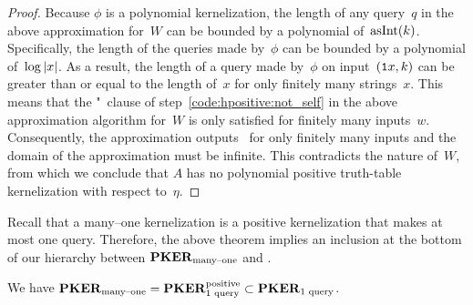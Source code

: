 \begin{proof}
  Because $\phi$ is a polynomial kernelization, the length of any query~$q$ in the above approximation for~$W$ can be bounded by a polynomial of~$\operatorname{asInt}(k)$.
  Specifically, the length of the queries made by~$\phi$ can be bounded by a polynomial of~$\log{\lvert x\rvert}$.
  As a result, the length of a query made by~$\phi$ on input~$(\textnormal{\texttt{1}}x, k)$ can be greater than or equal to the length of~$x$ for only finitely many strings~$x$.
  This means that the "~clause of step~\ref{code:hpositive:not_self} in the above approximation algorithm for~$W$ is only satisfied for finitely many inputs~$w$.
  Consequently, the approximation outputs~ for only finitely many inputs and the domain of the approximation must be infinite.
  This contradicts the nature of~$W$, from which we conclude that $A$ has no polynomial positive truth-table kernelization with respect to~$\eta$.
\end{proof}

Recall that a many--one kernelization is a positive kernelization that makes at most one query.
Therefore, the above theorem implies an inclusion at the bottom of our hierarchy between $\textnormal{\textbf{PKER}}_\textnormal{many--one}$ and .
\begin{corollary}
  We have $\textnormal{\textbf{PKER}}_\textnormal{many--one} = \textnormal{\textbf{PKER}}^\textnormal{positive}_\textnormal{$1$ query} \subset \textnormal{\textbf{PKER}}_\textnormal{$1$ query}$.
\end{corollary}

